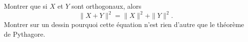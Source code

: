 
\begin{exercice}\label{exoOutilsMath-0001}

	Montrer que si $X$ et $Y$ sont orthogonaux, alors
	\begin{equation}
		\| X+Y \|^2=\| X \|^2+\| Y \|^2.
	\end{equation}
	Montrer sur un dessin pourquoi cette équation n'est rien d'autre que le théorème de Pythagore.

\end{exercice}
